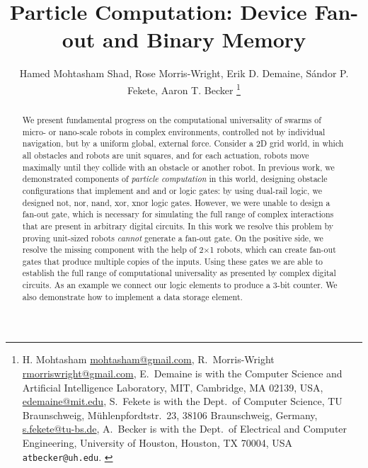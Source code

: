 \documentclass[letterpaper, 10 pt, conference]{ieeeconf}
\begin{document}

\title{\LARGE \bf 
Particle Computation:  Device Fan-out and Binary Memory 
}
\author{
Hamed Mohtasham Shad,
Rose Morris-Wright,
Erik D. Demaine,
S\'andor P. Fekete,
Aaron T. Becker
\thanks{{
H. Mohtasham  \protect\url{mohtasham@gmail.com},
R.~Morris-Wright  \protect\url{rmorriswright@gmail.com},
E.~Demaine is with the Computer Science and Artificial Intelligence Laboratory, MIT, Cambridge, MA 02139, USA,      \protect\url{edemaine@mit.edu},
S.~Fekete is with the Dept.~of Computer Science, TU Braunschweig,  M\"uhlenpfordtstr.~23, 38106 Braunschweig, Germany,
      \protect\url{s.fekete@tu-bs.de},
A.~Becker is with the  Dept.~of Electrical and Computer Engineering,  University of Houston, Houston, TX 70004, USA {\tt\small atbecker@uh.edu}.
}
} %
} %
\maketitle



\begin{abstract} 
We present fundamental progress on the computational universality of swarms of micro- or nano-scale robots
in complex environments, controlled not by individual navigation, but by a uniform global, external force.
Consider a 2D grid world, in which all obstacles and robots are unit squares,
and for each actuation, robots move maximally until they collide with an
obstacle or another robot. In previous work, we demonstrated components of \emph{particle computation} in this
world, designing obstacle configurations that implement {\sc and} and {\sc or}
logic gates:  by using dual-rail logic, we designed {\sc not, nor, nand, xor,
xnor} logic gates. However, we were unable to design a {\sc fan-out} gate, which
is necessary for simulating the full range of complex interactions
that are present in arbitrary digital circuits. In this work we resolve this 
problem by proving unit-sized robots {\em cannot} generate a {\sc fan-out} gate.  
On the positive side, we resolve the missing component with the help of 
2$\times$1 robots, which can create fan-out gates that produce multiple copies
of the inputs.  Using these gates we are able to establish the full range
of computational universality as presented by complex digital circuits.  As
an example we connect our logic elements to produce a 3-bit counter.  We also
demonstrate how to implement a data storage element.

\end{abstract}
\end{document}
